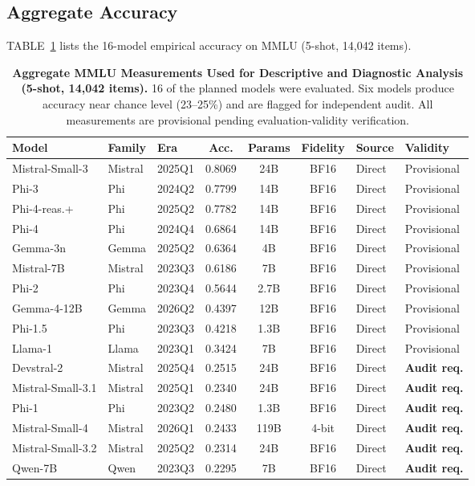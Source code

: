 \documentclass{ieeeaccess}
\theoremstyle{definition}
\theoremstyle{plain}
\begin{document}
\subsection{Aggregate Accuracy}
TABLE~\ref{tab:accuracy} lists the 16-model empirical accuracy on MMLU (5-shot, 14,042 items).

\begin{table}[!t]
\caption{\textbf{Aggregate MMLU Measurements Used for Descriptive and Diagnostic Analysis (5-shot, 14,042 items).} 16 of the planned models were evaluated. Six models produce accuracy near chance level (23--25\%) and are flagged for independent audit. All measurements are provisional pending evaluation-validity verification.}
\label{tab:accuracy}
\centering
\begin{tabular}{|l|l|l|c|c|c|l|l|}
\hline
\textbf{Model} & \textbf{Family} & \textbf{Era} & \textbf{Acc.} & \textbf{Params} & \textbf{Fidelity} & \textbf{Source} & \textbf{Validity} \\
\hline
Mistral-Small-3 & Mistral & 2025Q1 & 0.8069 & 24B & BF16 & Direct & Provisional \\
\hline
Phi-3 & Phi & 2024Q2 & 0.7799 & 14B & BF16 & Direct & Provisional \\
\hline
Phi-4-reas.+ & Phi & 2025Q2 & 0.7782 & 14B & BF16 & Direct & Provisional \\
\hline
Phi-4 & Phi & 2024Q4 & 0.6864 & 14B & BF16 & Direct & Provisional \\
\hline
Gemma-3n & Gemma & 2025Q2 & 0.6364 & 4B & BF16 & Direct & Provisional \\
\hline
Mistral-7B & Mistral & 2023Q3 & 0.6186 & 7B & BF16 & Direct & Provisional \\
\hline
Phi-2 & Phi & 2023Q4 & 0.5644 & 2.7B & BF16 & Direct & Provisional \\
\hline
Gemma-4-12B & Gemma & 2026Q2 & 0.4397 & 12B & BF16 & Direct & Provisional \\
\hline
Phi-1.5 & Phi & 2023Q3 & 0.4218 & 1.3B & BF16 & Direct & Provisional \\
\hline
Llama-1 & Llama & 2023Q1 & 0.3424 & 7B & BF16 & Direct & Provisional \\
\hline
Devstral-2 & Mistral & 2025Q4 & 0.2515 & 24B & BF16 & Direct & \textbf{Audit req.} \\
\hline
Mistral-Small-3.1 & Mistral & 2025Q1 & 0.2340 & 24B & BF16 & Direct & \textbf{Audit req.} \\
\hline
Phi-1 & Phi & 2023Q2 & 0.2480 & 1.3B & BF16 & Direct & \textbf{Audit req.} \\
\hline
Mistral-Small-4 & Mistral & 2026Q1 & 0.2433 & 119B & 4-bit & Direct & \textbf{Audit req.} \\
\hline
Mistral-Small-3.2 & Mistral & 2025Q2 & 0.2314 & 24B & BF16 & Direct & \textbf{Audit req.} \\
\hline
Qwen-7B & Qwen & 2023Q3 & 0.2295 & 7B & BF16 & Direct & \textbf{Audit req.} \\
\hline
\end{tabular}
\end{table}
\end{document}
